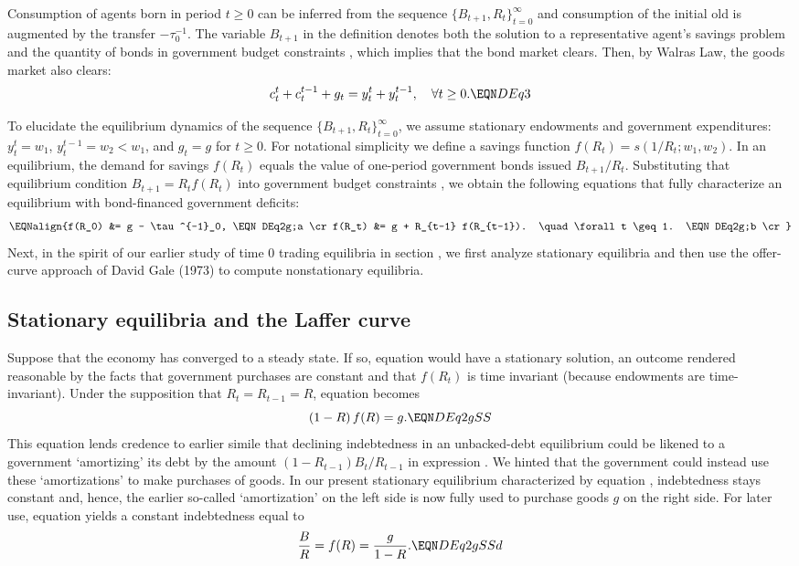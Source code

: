 \medskip

\noindent
Consumption of agents born in period $t\geq 0$ can be
inferred from the sequence $\{B_{t+1}, R_t\}_{t=0}^\infty$ 
and consumption of the initial old is augmented by the
transfer $-\tau^{-1}_0$. The variable $B_{t+1}$ in the definition
denotes both the solution to a representative agent's savings 
problem  and the quantity of bonds in government 
budget constraints , which implies that the 
bond market clears. Then, by Walras Law, the goods market also 
clears:
$$c_t^t + c_t^{t-1} + g_t = y_t^t + y_t^{t-1}, 
\quad \forall t \geq 0.        \EQN DEq3
$$


To elucidate the equilibrium dynamics of the sequence
$\{B_{t+1}, R_t\}_{t=0}^\infty$, we assume stationary
endowments and government expenditures: $y^t_t = w_1$,
$y^{t-1}_t=w_2<w_1$, and $g_t=g$ for $t\geq 0$. 
For notational simplicity we define a savings function
$f(R_t)= s(1/R_t; w_1, w_2)$. In an equilibrium, the 
demand for savings $f(R_t)$ 
equals the value of one-period government bonds issued
$B_{t+1}/R_t$. Substituting that equilibrium condition
$B_{t+1}=R_t f(R_t)$ into government budget constraints
, we obtain the following equations that
fully characterize an equilibrium with bond-financed 
government deficits:
$$\EQNalign{f(R_0) &= g - \tau^{-1}_0,   \EQN DEq2g;a  \cr
            f(R_t) &= g + R_{t-1} f(R_{t-1}).  \quad \forall t \geq 1. 
                                          \EQN DEq2g;b \cr} $$
Next, in the spirit of our
earlier study of time 0 trading equilibria in 
section , we first analyze 
stationary equilibria and then use the offer-curve approach 
of David Gale (1973) to compute nonstationary equilibria.



\subsection{Stationary equilibria and the Laffer curve}

Suppose that the economy has converged to a steady state. 
If so, equation  would have a stationary solution,
an outcome rendered reasonable by the facts that government 
purchases are constant and that $f(R_t)$ is time
invariant (because endowments are time-invariant).     
Under the supposition that $R_t=R_{t-1}=R$,
equation  becomes
$$ (1-R)\, f(R) = g.        \EQN DEq2gSS $$
This equation lends credence to earlier simile that 
declining indebtedness in an unbacked-debt equilibrium 
could be likened to a government `amortizing' its
debt by the amount $(1-R_{t-1})B_t/R_{t-1}$ in 
expression . We hinted that the government 
could instead use these `amortizations' to make 
purchases of goods. In our present stationary 
equilibrium characterized by equation ,
indebtedness stays constant and, hence, the earlier
so-called `amortization' on the left side is now
fully used to purchase goods $g$ on the right side.
For later use, equation  yields a constant 
indebtedness equal to 
$$ {B \over R} = f(R) = {g \over 1-R}.    \EQN DEq2gSSd $$

